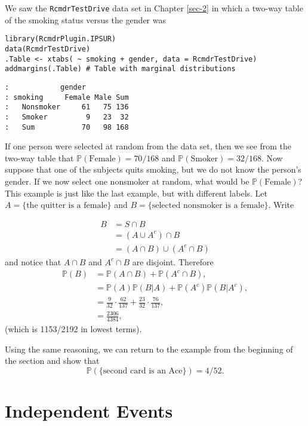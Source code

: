 We saw the \texttt{RcmdrTestDrive} data set in Chapter \ref{sec-2}
in which a two-way table of the smoking status versus the gender was

\begin{verbatim}
library(RcmdrPlugin.IPSUR)
data(RcmdrTestDrive)  
.Table <- xtabs( ~ smoking + gender, data = RcmdrTestDrive)
addmargins(.Table) # Table with marginal distributions
\end{verbatim}

\begin{verbatim}
:            gender
: smoking     Female Male Sum
:   Nonsmoker     61   75 136
:   Smoker         9   23  32
:   Sum           70   98 168
\end{verbatim}

If one person were selected at random from the data set, then we see
from the two-way table that \(\mathbb{P}(\mbox{Female})=70/168\) and
\(\mathbb{P}(\mbox{Smoker})=32/168\). Now suppose that one of the
subjects quits smoking, but we do not know the person's gender. If we
now select one nonsmoker at random, what would be
\(\mathbb{P}(\mbox{Female})\)? This example is just like the last
example, but with different labels. Let \( A = \{ \mbox{the quitter is
a female} \} \) and \( B = \{ \mbox{selected nonsmoker is a female} \}
\). Write

\begin{align*}
B & =S\cap B\\
 & =(A\cup A^{c})\cap B\\
 & =(A\cap B)\cup(A^{c}\cap B)
\end{align*}
and notice that \(A\cap B\) and \(A^{c}\cap B\) are disjoint. Therefore
\begin{align*}
\mathbb{P}(B) & =\mathbb{P}(A\cap B)+\mathbb{P}(A^{c}\cap B),\\
 & =\mathbb{P}(A)\mathbb{P}(B|A)+\mathbb{P}(A^{c})\mathbb{P}(B|A^{c}),\\
 & =\frac{9}{32}\cdot\frac{62}{137}+\frac{23}{32}\cdot\frac{76}{137},\\
 & =\frac{2306}{4384},
\end{align*}
(which is 1153/2192 in lowest terms).


Using the same reasoning, we can return to the example from the
beginning of the section and show that 
\[ \mathbb{P}(\{ \mbox{second
card is an Ace} \} )=4/52.  
\]

\section{Independent Events}
\label{sec-4-7}

